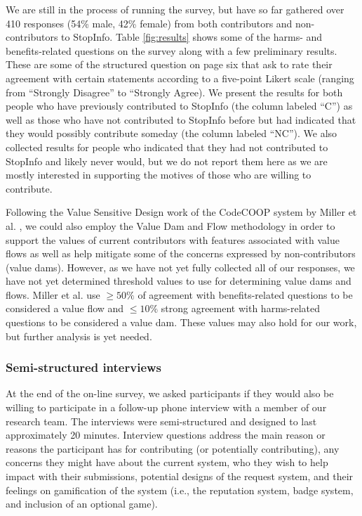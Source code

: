 We are still in the process of running the survey, but have so far gathered over 410 responses (54\% male, 42\% female) from both contributors and non-contributors to StopInfo. Table \ref{fig:results} shows some of the harms- and benefits-related questions on the survey along with a few preliminary results. These are some of the structured question on page six that ask to rate their agreement with certain statements according to a five-point Likert scale (ranging from ``Strongly Disagree'' to ``Strongly Agree). We present the results for both people who have previously contributed to StopInfo (the column labeled ``C'') as well as those who have not contributed to StopInfo before but had indicated that they would possibly contribute someday (the column labeled ``NC''). We also collected results for people who indicated that they had not contributed to StopInfo and likely never would, but we do not report them here as we are mostly interested in supporting the motives of those who are willing to contribute.

Following the Value Sensitive Design work of the CodeCOOP system by Miller et al. \cite{miller-2007}, we could also employ the Value Dam and Flow methodology in order to support the values of current contributors with features associated with value flows as well as help mitigate some of the concerns expressed by non-contributors (value dams). However, as we have not yet fully collected all of our responses, we have not yet determined threshold values to use for determining value dams and flows. Miller et al. use $\geq 50\%$ of agreement with benefits-related questions to be considered a value flow and  $\leq10\%$ strong agreement with harms-related questions to be considered a value dam. These values may also hold for our work, but further analysis is yet needed.

\pagebreak

\subsubsection{Semi-structured interviews}
At the end of the on-line survey, we asked participants if they would also be willing to participate in a follow-up phone interview with a member of our research team. The interviews were semi-structured and designed to last approximately 20 minutes. Interview questions address the main reason or reasons the participant has for contributing (or potentially contributing), any concerns they might have about the current system, who they wish to help impact with their submissions, potential designs of the request system, and their feelings on gamification of the system (i.e., the reputation system, badge system, and inclusion of an optional game). 


